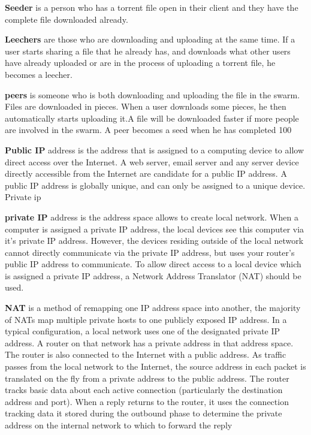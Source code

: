 \documentclass[11pt]{article}
\begin{document}
\textbf{Seeder}  is a person who has a torrent file open in their client and they have the complete file downloaded already.

\textbf{Leechers} are those who are downloading and uploading at the same time. If a user starts sharing a file that he already has, and downloads what other users have already uploaded or are in the process of uploading a torrent file, he becomes a leecher.

\textbf{peers}  is someone who is both downloading and uploading the file in the swarm. Files are downloaded in pieces. When a user downloads some pieces, he then automatically starts uploading it.A file will be downloaded faster if more people are involved in the swarm. A peer becomes a seed when he has completed 100%




\textbf{Public IP} address is the address that is assigned to a computing device to allow direct access over the Internet. A web server, email server and any server device directly accessible from the Internet are candidate for a public IP address. A public IP address is globally unique, and can only be assigned to a unique device.
Private ip

\textbf{private IP} address is the address space allows to create local network. When a computer is assigned a private IP address, the local devices see this computer via it's private IP address. However, the devices residing outside of the local network cannot directly communicate via the private IP address, but uses your router's public IP address to communicate. To allow direct access to a local device which is assigned a private IP address, a Network Address Translator (NAT) should be used.

\textbf{NAT} is a method of remapping one IP address space into another, the majority of NATs map multiple private hosts to one publicly exposed IP address. In a typical configuration, a local network uses one of the designated private IP address. 
A router on that network has a private address in that address space. The router is also connected to the Internet with a public address. As traffic passes from the local network to the Internet, the source address in each packet is translated on the fly from a private address to the public address. The router tracks basic data about each active connection (particularly the destination address and port). When a reply returns to the router, it uses the connection tracking data it stored during the outbound phase to determine the private address on the internal network to which to forward the reply
\end{document}

